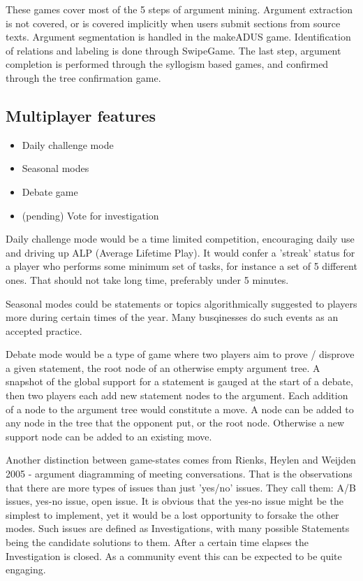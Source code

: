\documentclass{article}
\begin{document}
These games cover most of the 5 steps of argument mining. 
Argument extraction is not covered, or is covered implicitly when users submit sections from source texts. Argument segmentation is handled in the makeADUS game. Identification of relations and labeling is done through SwipeGame. The last step, argument completion is performed through the syllogism based games, and confirmed through the tree confirmation game.

\subsection{Multiplayer features}
\begin{itemize}
  \item Daily challenge mode
  \item Seasonal modes
  \item Debate game
  \item (pending) Vote for investigation
\end{itemize}
Daily challenge mode would be a time limited competition, encouraging daily use and driving up ALP (Average Lifetime Play). It would confer a 'streak' status for a player who performs some minimum set of tasks, for instance a set of 5 different ones. That should not take long time, preferably under 5 minutes.

Seasonal modes could be statements or topics algorithmically suggested to players more during certain times of the year. Many busqinesses do such events as an accepted practice.

Debate mode would be a type of game where two players aim to prove / disprove a given statement, the root node of an otherwise empty argument tree.  A snapshot of the global support for a statement is gauged at the start of a debate, then two players each add new statement nodes to the argument. Each addition of a node to the argument tree would constitute a move.
A node can be added to any node in the tree that the opponent put, or the root node. Otherwise a new support node can be added to an existing move.


Another distinction between game-states comes from Rienks, Heylen and Weijden 2005 - argument diagramming of meeting conversations. That is the observations that there are more types of issues than just 'yes/no' issues. They call them: A/B issues, yes-no issue, open issue. It is obvious that the yes-no issue might be the simplest to implement, yet it would be a lost opportunity to forsake the other modes.
Such issues are defined as Investigations, with many possible Statements being the candidate solutions to them. After a certain time elapses the Investigation is closed. As a community event this can be expected to be quite engaging.
\end{document}
